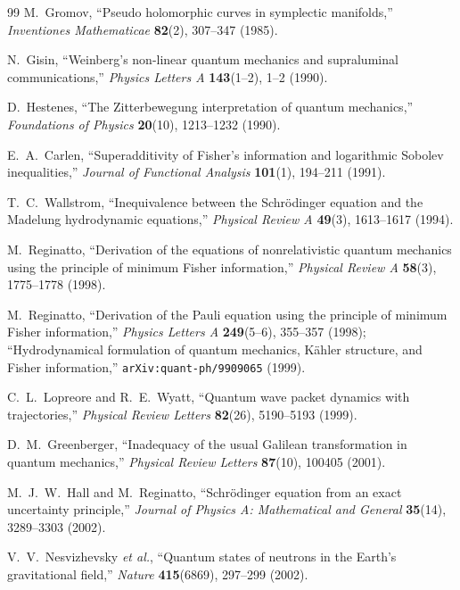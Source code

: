 \documentclass[11pt, a4paper]{article}
\theoremstyle{definition}
\begin{document}
\begin{thebibliography}{99}
M.~Gromov, ``Pseudo holomorphic curves in symplectic manifolds,'' \textit{Inventiones Mathematicae} \textbf{82}(2), 307--347 (1985).

N.~Gisin, ``Weinberg's non-linear quantum mechanics and supraluminal communications,'' \textit{Physics Letters A} \textbf{143}(1--2), 1--2 (1990).

D.~Hestenes, ``The Zitterbewegung interpretation of quantum mechanics,'' \textit{Foundations of Physics} \textbf{20}(10), 1213--1232 (1990).

E.~A.~Carlen, ``Superadditivity of Fisher's information and logarithmic Sobolev inequalities,'' \textit{Journal of Functional Analysis} \textbf{101}(1), 194--211 (1991).

T.~C.~Wallstrom, ``Inequivalence between the Schr\"{o}dinger equation and the Madelung hydrodynamic equations,'' \textit{Physical Review A} \textbf{49}(3), 1613--1617 (1994).

M.~Reginatto, ``Derivation of the equations of nonrelativistic quantum mechanics using the principle of minimum Fisher information,'' \textit{Physical Review A} \textbf{58}(3), 1775--1778 (1998).

M.~Reginatto, ``Derivation of the Pauli equation using the principle of minimum Fisher information,'' \textit{Physics Letters A} \textbf{249}(5--6), 355--357 (1998); ``Hydrodynamical formulation of quantum mechanics, K\"{a}hler structure, and Fisher information,'' \texttt{arXiv:quant-ph/9909065} (1999).

C.~L.~Lopreore and R.~E.~Wyatt, ``Quantum wave packet dynamics with trajectories,'' \textit{Physical Review Letters} \textbf{82}(26), 5190--5193 (1999).

D.~M.~Greenberger, ``Inadequacy of the usual Galilean transformation in quantum mechanics,'' \textit{Physical Review Letters} \textbf{87}(10), 100405 (2001).

M.~J.~W.~Hall and M.~Reginatto, ``Schr\"{o}dinger equation from an exact uncertainty principle,'' \textit{Journal of Physics A: Mathematical and General} \textbf{35}(14), 3289--3303 (2002).

V.~V.~Nesvizhevsky \textit{et al.}, ``Quantum states of neutrons in the Earth's gravitational field,'' \textit{Nature} \textbf{415}(6869), 297--299 (2002).


\end{thebibliography}
\end{document}
